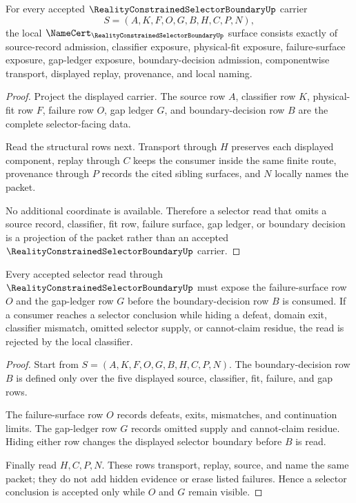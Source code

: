 \begin{theorem}
\label{thm:reality-constrained-selector-boundary-namecert-obligations}
For every accepted $\RealityConstrainedSelectorBoundaryUp$ carrier
$$
S=(A,K,F,O,G,B,H,C,P,N),
$$
the local $\NameCert_{\RealityConstrainedSelectorBoundaryUp}$ surface consists exactly of source-record admission, classifier exposure, physical-fit exposure, failure-surface exposure, gap-ledger exposure, boundary-decision admission, componentwise transport, displayed replay, provenance, and local naming.
\end{theorem}
\begin{proof}
Project the displayed carrier. The source row $A$, classifier row $K$, physical-fit row $F$, failure row $O$, gap ledger $G$, and boundary-decision row $B$ are the complete selector-facing data.

Read the structural rows next. Transport through $H$ preserves each displayed component, replay through $C$ keeps the consumer inside the same finite route, provenance through $P$ records the cited sibling surfaces, and $N$ locally names the packet.

No additional coordinate is available. Therefore a selector read that omits a source record, classifier, fit row, failure surface, gap ledger, or boundary decision is a projection of the packet rather than an accepted $\RealityConstrainedSelectorBoundaryUp$ carrier.
\end{proof}

\begin{theorem}
\label{thm:reality-constrained-selector-boundary-failure-surface-nonescape}
Every accepted selector read through $\RealityConstrainedSelectorBoundaryUp$ must expose the failure-surface row $O$ and the gap-ledger row $G$ before the boundary-decision row $B$ is consumed. If a consumer reaches a selector conclusion while hiding a defeat, domain exit, classifier mismatch, omitted selector supply, or cannot-claim residue, the read is rejected by the local classifier.
\end{theorem}
\begin{proof}
Start from $S=(A,K,F,O,G,B,H,C,P,N)$. The boundary-decision row $B$ is defined only over the five displayed source, classifier, fit, failure, and gap rows.

The failure-surface row $O$ records defeats, exits, mismatches, and continuation limits. The gap-ledger row $G$ records omitted supply and cannot-claim residue. Hiding either row changes the displayed selector boundary before $B$ is read.

Finally read $H,C,P,N$. These rows transport, replay, source, and name the same packet; they do not add hidden evidence or erase listed failures. Hence a selector conclusion is accepted only while $O$ and $G$ remain visible.
\end{proof}

